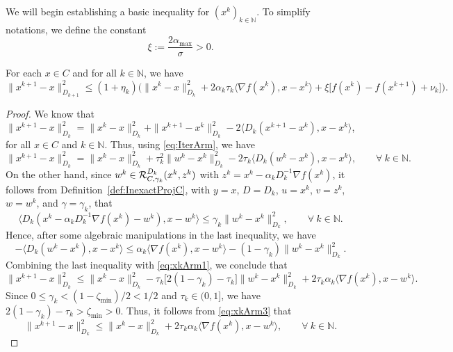 We will begin establishing  a basic inequality for    $(x^k)_{k\in\mathbb{N}}$.  To simplify  notations, we define the constant
\begin{equation} \label{eq:eta}
	\xi := \dfrac{2 \alpha_{\max}}{\sigma} > 0.
\end{equation}
\begin{lemma}\label{Le:xkArm}
	For each  $x\in C$ and for all $k \in \mathbb{N}$, we have
	\begin{equation}\label{eq:xkArm}
		\|x^{k+1}-x\|_{D_{k+1}}^2 \leq (1+\eta_k)\Big(\|x^k-x\|_{D_k}^2 + 2\alpha_k\tau_k \big\langle \nabla f(x^k), x-x^k\big\rangle + \xi \big[f(x^k) - f(x^{k+1})+ \nu_k \big]\Big).
	\end{equation}
\end{lemma}
\begin{proof}
	We know that $\|x^{k+1}-x\|_{D_k}^2 = \|x^k-x\|_{D_k}^2 + \|x^{k+1}-x^k\|_{D_k}^2 - 2 \langle {D_k} ( x^{k+1}-x^k), x-x^k \rangle$, for all $x \in C$ and $k \in \mathbb{N}$. Thus, using \eqref{eq:IterArm}, we have
	\begin{equation}\label{eq:xkArm1}
		\|x^{k+1}-x\|_{D_k}^2 = \|x^k-x\|_{D_k}^2 + \tau_k^2\|w^k - x^{k}\|_{D_k}^2 - 2 \tau_k \big\langle {D_k}(w^k - x^{k}), x-x^k \big\rangle, \qquad \forall ~k \in \mathbb{N}.
	\end{equation}
	On the other hand, since  $w^k \in{\cal R}_{C,\gamma_k}^{D_k}(x^{k}, z^k)$ with $z^k = x^{k}-\alpha_k D_k^{-1} \nabla f(x^{k})$, it follows from Definition~\ref{def:InexactProjC},  with $y=x$, $D = D_k$, $u = x^k$, $v = z^k$, $w = w^k$,  and $\gamma = \gamma_k$,  that
	$$
		\big\langle D_k(x^k-\alpha_kD_k^{-1}\nabla f(x^k)-w^k), x-w^k\big\rangle \leq \gamma_k \|w^k - x^{k}\|_{D_k}^2, \qquad \forall ~k \in \mathbb{N}.
	$$
	Hence,  after some algebraic manipulations in the last inequality, we have
	$$
		-\big\langle D_k(w^k-x^k), x-x^k\big\rangle \leq \alpha_k \big\langle \nabla f(x^k), x-w^k \big\rangle - (1-\gamma_k) \|w^k-x^k\|_{D_k}^2.
	$$
	Combining the last inequality with \eqref{eq:xkArm1},  we conclude  that
	\begin{equation} \label{eq:xkArm3}
		\|x^{k+1}-x\|_{D_k}^2 \leq \|x^k-x\|_{D_k}^2 - \tau_k \big[2(1-\gamma_k) - \tau_k \big] \|w^k-x^k\|_{D_k}^2 + 2\tau_k\alpha_k \big\langle \nabla f(x^k), x-w^k\big\rangle.
	\end{equation}
	Since $0 \leq \gamma_k <(1-{\zeta_{\min}})/2 < 1/2$ and $\tau_k \in (0, 1]$, we have $2(1-\gamma_k) - \tau_k > {\zeta_{\min}} > 0$. Thus, it follows from \eqref{eq:xkArm3} that
	$$
		\|x^{k+1}-x\|_{D_k}^2 \leq \|x^k-x\|_{D_k}^2 + 2\tau_k\alpha_k \big\langle \nabla f(x^k), x-w^k\big\rangle, \qquad \forall ~k \in \mathbb{N}.
$$
\end{proof}
